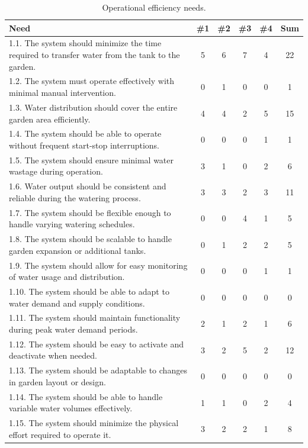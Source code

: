\documentclass[12pt]{report}
\begin{document}
\renewcommand{\thetable}{\thechapter.1a}
\begin{table}[H]
\centering
\captionsetup{labelformat=default,labelsep=colon}
\caption{Operational efficiency needs.}
\label{table:1a}
\begin{tabular}{|p{10cm}|c|c|c|c|c|}
\hline
\textbf{Need} & \textbf{\#1} & \textbf{\#2} & \textbf{\#3} & \textbf{\#4} & \textbf{Sum} \\
\hline
1.1. The system should minimize the time required to transfer water from the tank to the garden. & 5 & 6 & 7 & 4 & \cellcolor{yellow}22 \\
1.2. The system must operate effectively with minimal manual intervention. & 0 & 1 & 0 & 0 & 1 \\
1.3. Water distribution should cover the entire garden area efficiently. & 4 & 4 & 2 & 5 & \cellcolor{yellow}15 \\
1.4. The system should be able to operate without frequent start-stop interruptions. & 0 & 0 & 0 & 1 & 1 \\
1.5. The system should ensure minimal water wastage during operation. & 3 & 1 & 0 & 2 & 6 \\
1.6. Water output should be consistent and reliable during the watering process. & 3 & 3 & 2 & 3 & \cellcolor{yellow}11 \\
1.7. The system should be flexible enough to handle varying watering schedules. & 0 & 0 & 4 & 1 & 5 \\
1.8. The system should be scalable to handle garden expansion or additional tanks. & 0 & 1 & 2 & 2 & 5 \\
1.9. The system should allow for easy monitoring of water usage and distribution. & 0 & 0 & 0 & 1 & 1 \\
1.10. The system should be able to adapt to water demand and supply conditions. & 0 & 0 & 0 & 0 & 0 \\
1.11. The system should maintain functionality during peak water demand periods. & 2 & 1 & 2 & 1 & 6 \\
1.12. The system should be easy to activate and deactivate when needed. & 3 & 2 & 5 & 2 & \cellcolor{yellow}12 \\
1.13. The system should be adaptable to changes in garden layout or design. & 0 & 0 & 0 & 0 & 0 \\
1.14. The system should be able to handle variable water volumes effectively. & 1 & 1 & 0 & 2 & 4 \\
1.15. The system should minimize the physical effort required to operate it. & 3 & 2 & 2 & 1 & \cellcolor{yellow}8 \\

\end{tabular}
\end{table}
\end{document}

